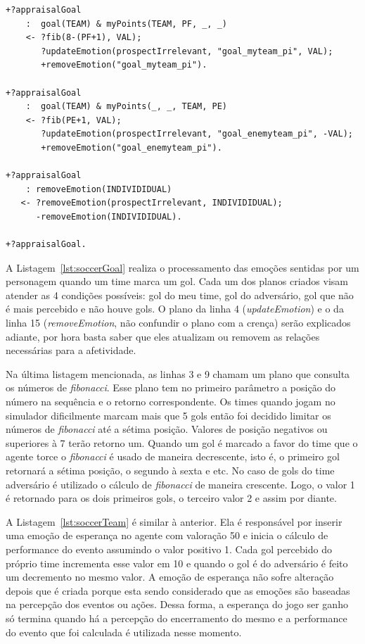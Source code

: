 \begin{center}
    \begin{minipage}{120mm}
	\lstset{linewidth=120mm}
	\begin{lstlisting}[frame=trbl,
caption=Parte do código do agente referente à avaliação de gol.,
label=lst:soccerGoal]
+?appraisalGoal
    :  goal(TEAM) & myPoints(TEAM, PF, _, _)
    <- ?fib(8-(PF+1), VAL);
       ?updateEmotion(prospectIrrelevant, "goal_myteam_pi", VAL);
       +removeEmotion("goal_myteam_pi").

+?appraisalGoal
    :  goal(TEAM) & myPoints(_, _, TEAM, PE)
    <- ?fib(PE+1, VAL);
       ?updateEmotion(prospectIrrelevant, "goal_enemyteam_pi", -VAL);
       +removeEmotion("goal_enemyteam_pi").

+?appraisalGoal
    : removeEmotion(INDIVIDIDUAL)
   <- ?removeEmotion(prospectIrrelevant, INDIVIDIDUAL);
      -removeEmotion(INDIVIDIDUAL).

+?appraisalGoal.
	\end{lstlisting}
    \end{minipage}
\end{center}

A Listagem~\ref{lst:soccerGoal} realiza o processamento das emoções sentidas
por um personagem quando um time marca um gol. Cada um dos planos criados
visam atender as 4 condições possíveis: gol do meu time, gol do adversário,
gol que não é mais percebido e não houve gols. O plano da
linha 4 (\emph{updateEmotion}) e o da linha 15 (\emph{removeEmotion}, não
confundir o plano com a crença) serão explicados adiante, por hora basta saber
que eles atualizam ou removem as relações necessárias para a afetividade.

Na última listagem mencionada, as linhas 3 e 9 chamam um plano que consulta os números de
\emph{fibonacci}. Esse plano tem no primeiro parâmetro a posição do número na
sequência e o retorno correspondente.
Os times quando jogam no simulador dificilmente
marcam mais que 5 gols então foi decidido limitar os números de
\emph{fibonacci} até a sétima posição. Valores de posição negativos ou
superiores à 7 terão retorno um. Quando um gol é marcado
a favor do time que o agente torce o \emph{fibonacci} é usado de maneira
decrescente, isto é, o primeiro gol retornará a sétima posição, o segundo à
sexta e etc. No caso de gols do time adversário é utilizado o cálculo de
\emph{fibonacci} de maneira crescente. Logo, o valor 1 é retornado para os
dois primeiros gols, o terceiro valor 2 e assim por diante.

A Listagem~\ref{lst:soccerTeam} é similar à anterior. Ela é responsável por inserir uma
emoção de esperança no agente com valoração 50 e inicia o cálculo de
performance do evento assumindo o valor positivo 1. Cada gol percebido
do próprio time incrementa esse valor em 10 e quando o gol é do
adversário é feito um decremento no mesmo valor. A emoção de esperança não
sofre alteração depois que é criada porque esta sendo considerado que as
emoções são baseadas na percepção dos eventos ou ações. Dessa forma, a esperança do
jogo ser ganho só termina quando há a percepção do encerramento do mesmo e a
performance do evento que foi calculada é utilizada nesse momento.

